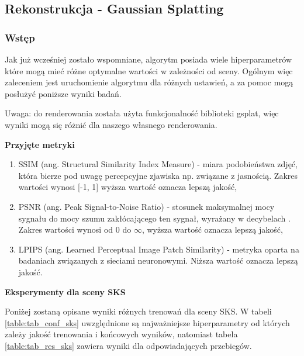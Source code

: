 \subsection{Rekonstrukcja - Gaussian Splatting}

\subsubsection{Wstęp}
Jak już wcześniej zostało wspomniane, algorytm posiada wiele hiperparametrów które mogą mieć różne optymalne wartości w zależności od sceny. Ogólnym więc zaleceniem jest uruchomienie algorytmu dla różnych ustawień, a za pomoc mogą posłużyć poniższe wyniki badań. 

Uwaga: do renderowania została użyta funkcjonalność biblioteki gsplat, więc wyniki mogą się różnić dla naszego własnego renderowania. 

\textbf{Przyjęte metryki}
\begin{enumerate}
    \item SSIM (ang. Structural Similarity Index Measure) - miara podobieństwa zdjęć, która bierze pod uwagę percepcyjne zjawiska np. związane z jasnością. Zakres wartości wynosi [-1, 1] wyższa wartość oznacza lepszą jakość,
    \item PSNR (ang. Peak Signal-to-Noise Ratio) - stosunek maksymalnej mocy sygnału do mocy szumu zakłócającego ten sygnał, wyrażany w decybelach . Zakres wartości wynosi od 0 do $\infty$, wyższa wartość oznacza lepszą jakość,
    \item LPIPS (ang. Learned Perceptual Image Patch Similarity) - metryka oparta na badaniach związanych z sieciami neuronowymi. Niższa wartość oznacza lepszą jakość. 
\end{enumerate}

\textbf{Eksperymenty dla sceny SKS}

Poniżej zostaną opisane wyniki różnych trenowań dla sceny SKS. W tabeli \ref{table:tab_conf_sks} uwzględnione są najważniejsze hiperparametry od których zależy jakość trenowania i końcowych wyników, natomiast tabela \ref{table:tab_res_sks} zawiera wyniki dla odpowiadających przebiegów. 

